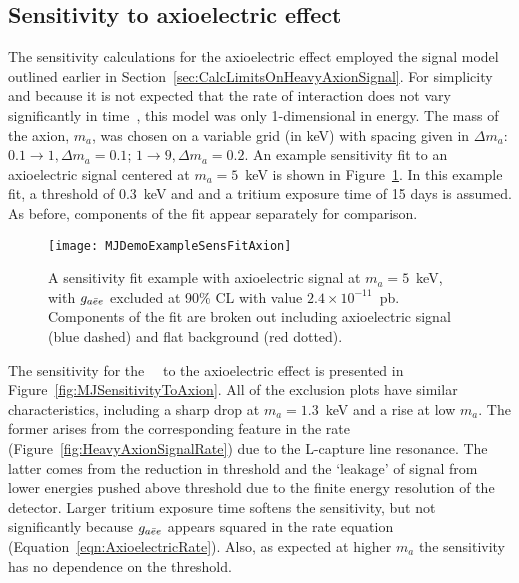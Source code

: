 		\subsection{Sensitivity to axioelectric effect}
		\label{sec:MJSensitivityToAxions}
		
	The sensitivity calculations for the axioelectric effect employed the signal model outlined earlier in Section~\ref{sec:CalcLimitsOnHeavyAxionSignal}.  For simplicity and because it is not expected that the rate of interaction does not vary significantly in time~\cite{Pospelov:2008jk}, this model was only 1-dimensional in energy.  The mass of the axion, $m_{a}$, was chosen on a variable grid (in keV) with spacing given in $\Delta m_{a}$: $0.1\to1, \Delta m_{a} = 0.1$; $1\to9, \Delta m_{a} = 0.2$.  An example sensitivity fit to an axioelectric signal centered at $m_{a}=5$~keV is shown in Figure~\ref{fig:MJSensitivityToAxionExample}.  In this example fit, a threshold of 0.3~keV and and a tritium exposure time of 15 days is assumed.  As before, components of the fit appear separately for comparison.   
		
			\begin{figure}
				\centering
				\texttt{[image: MJDemoExampleSensFitAxion]}
				\caption[\MJ~\minmod axioelectric sensitivity fit example.]{A sensitivity fit example 
				with axioelectric signal at $m_{a}=5$~keV, with $g_{a\bar{e}e}$ excluded at 90\% CL with
				value
				 $2.4\times10^{-11}$~pb.  Components of the fit are broken out including axioelectric 
				 signal (blue dashed) and flat background (red dotted).  }
				\label{fig:MJSensitivityToAxionExample}
			\end{figure}
	
	The sensitivity for the \MJ~\minmod~to the axioelectric effect is presented in Figure~\ref{fig:MJSensitivityToAxion}.  All of the exclusion plots have similar characteristics, including a sharp drop at $m_{a}=1.3$~keV and a rise at low $m_{a}$.  The former arises from the corresponding feature in the rate (Figure~\ref{fig:HeavyAxionSignalRate}) due to the L-capture line resonance.  The latter comes from the reduction in threshold and the `leakage' of signal from lower energies pushed above threshold due to the finite energy resolution of the detector.  Larger tritium exposure time softens the sensitivity, but not significantly because $g_{a\bar{e}e}$ appears squared in the rate equation (Equation~\ref{eqn:AxioelectricRate}).  Also, as expected at higher $m_{a}$ the sensitivity has no dependence on the threshold.
	

